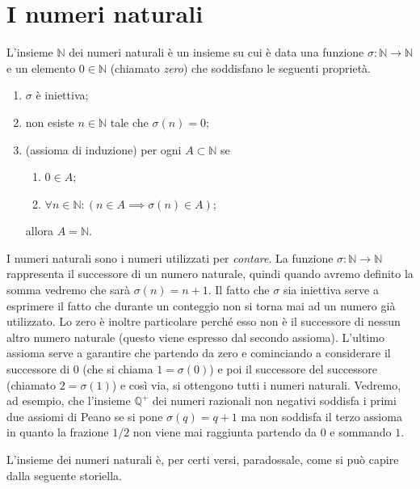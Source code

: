 \documentclass[italian,a4paper,hidelinks,headinclude]{scrartcl}
\newcommand{\NN}{{\mathbb N}}
\newcommand{\QQ}{{\mathbb Q}}
\newcommand{\myemph}[1]{\emph{#1}\marginpar{#1}}
\newcommand{\enclose}[1]{\left({#1}\right)}
\begin{document}
\section{I numeri naturali}

\begin{theorem}
  L'insieme $\NN$ dei numeri naturali è un insieme su cui
  è data una funzione $\sigma\colon \NN\to\NN$ e un
  elemento $0\in \NN$ (chiamato \myemph{zero}) che soddisfano le seguenti proprietà.
  \begin{enumerate}
  \item $\sigma$ è iniettiva;
  \item non esiste $n\in \NN$ tale che $\sigma(n)=0$;
  \item (assioma di induzione)
  per ogni $A\subset \NN$ se
  \begin{enumerate}
     \item $0\in A$;
     \item $\forall n\in \NN \colon \enclose{n\in A \implies \sigma(n) \in A}$;
  \end{enumerate}
  allora $A= \NN$.
  \end{enumerate}
\end{theorem}

I numeri naturali sono i numeri utilizzati per \emph{contare}.
La funzione $\sigma\colon \NN \to \NN$ rappresenta il successore di un numero
naturale, quindi quando avremo definito la somma vedremo che sarà
$\sigma(n)=n+1$.
Il fatto che $\sigma$ sia iniettiva serve a esprimere il fatto che
durante un conteggio non si torna mai ad un numero già utilizzato.
Lo zero è inoltre particolare perché esso non è il successore di nessun altro
numero naturale (questo viene espresso dal secondo assioma).
L'ultimo assioma serve a garantire che partendo da zero e cominciando
a considerare il successore di 0 (che si chiama $1=\sigma(0)$) e poi il
successore del successore (chiamato $2=\sigma(1)$) e così via, si ottengono
tutti i numeri naturali. Vedremo, ad esempio, che l'insieme $\QQ^+$
dei numeri razionali non negativi
soddisfa i primi due assiomi di Peano se si pone $\sigma(q)=q+1$
ma non soddisfa il terzo assioma in quanto la frazione $1/2$ non viene mai raggiunta
partendo da $0$ e sommando $1$.

L'insieme dei numeri naturali è, per certi versi, paradossale, come si può
capire dalla seguente storiella.
\end{document}
